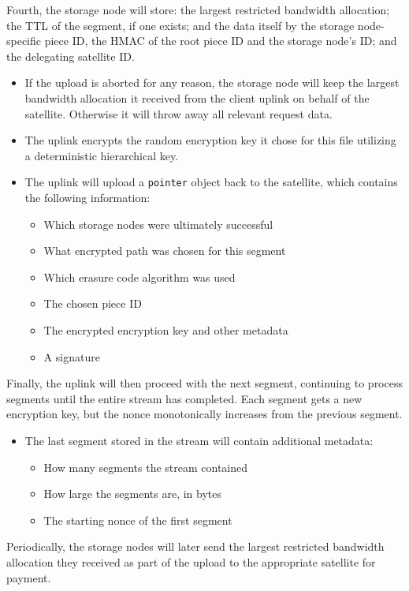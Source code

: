 \documentclass[11pt,fleqn,openany]{book}
\newcommand{\x}[1]{{\tt #1}} \newcommand{\code}[1]{{\em #1}}
\begin{document}
Fourth, the storage node will store: the largest restricted bandwidth allocation;
the TTL of the segment, if one exists; and the data itself by the storage
node-specific piece ID, the HMAC of the root piece ID and the storage node's
ID; and the delegating satellite ID.

\begin{itemize}
\item If the upload is aborted for any reason, the storage node will keep the
  largest bandwidth allocation it received from the client uplink on behalf of
  the satellite. Otherwise it will throw away all relevant request data.
\item The uplink encrypts the random encryption key it chose for this file
  utilizing a deterministic hierarchical key.
\item The uplink will upload a \x{pointer} object back to the satellite, which
  contains the following information:
  \begin{itemize}
  \item Which storage nodes were ultimately successful
  \item What encrypted path was chosen for this segment
  \item Which erasure code algorithm was used
  \item The chosen piece ID
  \item The encrypted encryption key and other metadata
  \item A signature
  \end{itemize}
\end{itemize}

Finally, the uplink will then proceed with the next segment, continuing to
process segments until the entire stream has completed. Each segment gets
a new encryption key, but the nonce monotonically increases from the previous
segment.

\begin{itemize}
\item The last segment stored in the stream will contain additional metadata:
  \begin{itemize}
  \item How many segments the stream contained
  \item How large the segments are, in bytes
  \item The starting nonce of the first segment
  \end{itemize}
\end{itemize}

Periodically, the storage nodes will later send the largest restricted
bandwidth allocation they received as part of the upload to the appropriate
satellite for payment.
\end{document}
